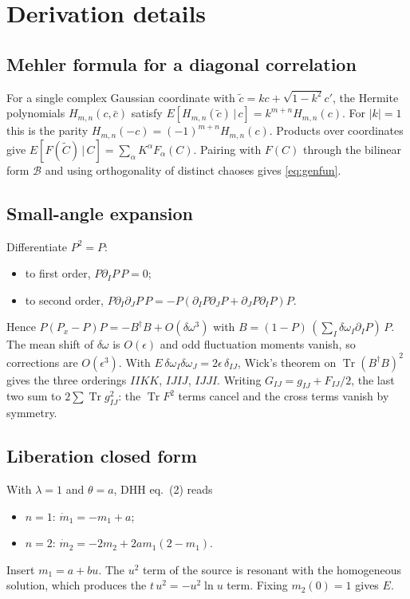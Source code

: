 \documentclass[11pt]{article}
\newcommand{\Tr}{\operatorname{Tr}}
\theoremstyle{remark}
\begin{document}
\appendix
\section{Derivation details}
\subsection{Mehler formula for a diagonal correlation}
For a single complex Gaussian coordinate with $\tilde c=kc+\sqrt{1-k^2}c'$, the Hermite polynomials $H_{m,n}(c,\bar c)$
satisfy $E[H_{m,n}(\tilde c)\,|\,c]=k^{m+n}H_{m,n}(c)$. For $|k|=1$ this is the parity
$H_{m,n}(-c)=(-1)^{m+n}H_{m,n}(c)$. Products over coordinates give $E[F(\tilde C)\,|\,C]=\sum_\alpha K^\alpha F_\alpha(C)$.
Pairing with $F(C)$ through the bilinear form $\mathcal B$ and using orthogonality of distinct chaoses gives
\eqref{eq:genfun}.

\subsection{Small-angle expansion}
Differentiate $P^2=P$:
\begin{itemize}\itemsep1pt
\item to first order, $P\partial_IP\,P=0$;
\item to second order, $P\partial_I\partial_JP\,P=-P(\partial_IP\partial_JP+\partial_JP\partial_IP)P$.
\end{itemize}
Hence $P(P_x-P)P=-B^\dagger B+O(\delta\omega^3)$ with $B=(1-P)\,(\sum_I\delta\omega_I\partial_IP)\,P$. The mean shift of
$\delta\omega$ is $O(\epsilon)$ and odd fluctuation moments vanish, so corrections are $O(\epsilon^3)$. With
$E\,\delta\omega_I\delta\omega_J=2\epsilon\,\delta_{IJ}$, Wick's theorem on $\Tr(B^\dagger B)^2$ gives the three orderings
$IIKK$, $IJIJ$, $IJJI$. Writing $G_{IJ}=g_{IJ}+F_{IJ}/2$, the last two sum to $2\sum\Tr g_{IJ}^2$: the $\Tr F^2$ terms
cancel and the cross terms vanish by symmetry.

\subsection{Liberation closed form}
With $\lambda=1$ and $\theta=a$, DHH eq.~(2) reads
\begin{itemize}\itemsep1pt
\item $n=1$: $\dot m_1=-m_1+a$;
\item $n=2$: $\dot m_2=-2m_2+2am_1(2-m_1)$.
\end{itemize}
Insert $m_1=a+bu$. The $u^2$ term of the source is resonant with the homogeneous solution, which produces the
$t\,u^2=-u^2\ln u$ term. Fixing $m_2(0)=1$ gives $E$.
\end{document}
